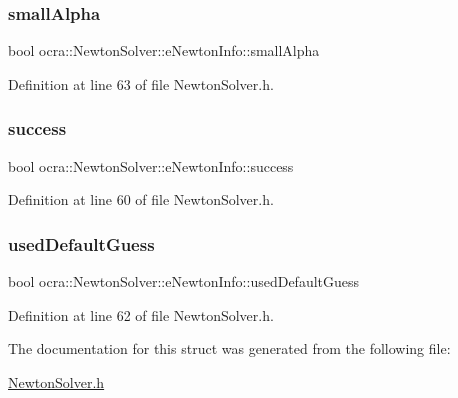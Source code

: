\subsubsection{\texorpdfstring{small\+Alpha}{smallAlpha}}
{\footnotesize\ttfamily bool ocra\+::\+Newton\+Solver\+::e\+Newton\+Info\+::small\+Alpha}



Definition at line 63 of file Newton\+Solver.\+h.

\hypertarget{structocra_1_1NewtonSolver_1_1eNewtonInfo_ad3fb93c95fbe6e760caffc64fa1739cb}{}\label{structocra_1_1NewtonSolver_1_1eNewtonInfo_ad3fb93c95fbe6e760caffc64fa1739cb} 
\subsubsection{\texorpdfstring{success}{success}}
{\footnotesize\ttfamily bool ocra\+::\+Newton\+Solver\+::e\+Newton\+Info\+::success}



Definition at line 60 of file Newton\+Solver.\+h.

\hypertarget{structocra_1_1NewtonSolver_1_1eNewtonInfo_a210ebc2859be22918cc378fc16a5cf88}{}\label{structocra_1_1NewtonSolver_1_1eNewtonInfo_a210ebc2859be22918cc378fc16a5cf88} 
\subsubsection{\texorpdfstring{used\+Default\+Guess}{usedDefaultGuess}}
{\footnotesize\ttfamily bool ocra\+::\+Newton\+Solver\+::e\+Newton\+Info\+::used\+Default\+Guess}



Definition at line 62 of file Newton\+Solver.\+h.



The documentation for this struct was generated from the following file\+:\begin{DoxyCompactItemize}
\item 
\hyperlink{NewtonSolver_8h}{Newton\+Solver.\+h}\end{DoxyCompactItemize}
